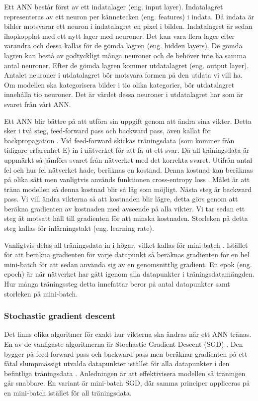 \documentclass[]{kththesis}
\begin{document}
Ett ANN består först av ett indatalager (eng. input layer). Indatalagret representeras av ett neuron per kännetecken (eng. features) i indata. Då indata är bilder motsvarar ett neuron i indatalagret en pixel i bilden. Indatalagret är sedan ihopkopplat med ett nytt lager med neuroner. Det kan vara flera lager efter varandra och dessa kallas för de gömda lagren (eng. hidden layers). De gömda lagren kan bestå av godtyckligt många neuroner och de behöver inte ha samma antal neuroner. Efter de gömda lagren kommer utdatalagret (eng. output layer). Antalet neuroner i utdatalagret bör motsvara formen på den utdata vi vill ha. Om modellen ska kategorisera bilder i tio olika kategorier, bör utdatalagret innehålla tio neuroner. Det är värdet dessa neuroner i utdatalagret har som är svaret från vårt ANN.

Ett ANN blir bättre på att utföra sin uppgift genom att ändra sina vikter. Detta sker i två steg, feed-forward pass och backward pass, även kallat för backpropagation \parencite{alpaydin2009introduction}. Vid feed-forward skickas träningsdata (som kommer från tidigare erfarenhet E) in i nätverket för att få ut ett svar. Då all träningsdata är uppmärkt så jämförs svaret från nätverket med det korrekta svaret. Utifrån antal fel och hur fel nätverket hade, beräknas en kostnad. Denna kostnad kan beräknas på olika sätt men vanligtvis används funktionen cross-entropy loss \parencite{Goodfellow-et-al-2016}. Målet är att träna modellen så denna kostnad blir så låg som möjligt. Nästa steg är backward pass. Vi vill ändra vikterna så att kostnaden blir lägre, detta görs genom att beräkna gradienten av kostnaden med avseende på alla vikter. Vi tar sedan ett steg åt motsatt håll till gradienten för att minska kostnaden. Storleken på detta steg kallas för inlärningstakt (eng. learning rate).

Vanligtvis delas all träningsdata in i högar, vilket kallas för mini-batch \parencite{Goodfellow-et-al-2016}. Istället för att beräkna gradienten för varje datapunkt så beräknas gradienten för en hel mini-batch för att sedan använda sig av en genomsnittlig gradient. En epok (eng. epoch) är när nätverket har gått igenom alla datapunkter i träningsdatamängden. Hur många träningssteg detta innefattar beror på antal datapunkter samt storleken på mini-batch.

\subsubsection{Stochastic gradient descent}
Det finns olika algoritmer för exakt hur vikterna ska ändras när ett ANN tränas. En av de vanligaste algoritmerna är Stochastic Gradient Descent (SGD) \parencite{Goodfellow-et-al-2016}. Den bygger på feed-forward pass och backward pass men beräknar gradienten på ett fåtal slumpmässigt utvalda datapunkter istället för alla datapunkter i den befintliga träningsdata \parencite{bottou2010large}. Anledningen är att effektivisera modellen så träningen går snabbare. En variant är mini-batch SGD, där samma principer appliceras på en mini-batch istället för all träningsdata.
\end{document}
